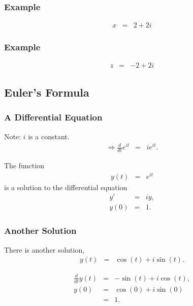 \begin{frame}
  \frametitle{Example}

  \begin{eqnarray*}
    x & = &  2 + 2i
  \end{eqnarray*}

\end{frame}


\begin{frame}
  \frametitle{Example}

  \begin{eqnarray*}
    z & = & -2 + 2i
  \end{eqnarray*}
    
\end{frame}

\subsection{Euler's Formula}

\begin{frame}
  \frametitle{A Differential Equation}

  Note: $i$ is a constant.
  \begin{eqnarray*}
    \Rightarrow \frac{d}{dt} e^{it} & = & i e^{it}.
  \end{eqnarray*}

  The function
  \begin{eqnarray*}
    y(t) & = & e^{it}
  \end{eqnarray*}
  is a solution to the differential equation
  \begin{eqnarray*}
    y' & = & iy, \\
    y(0) & = & 1.
  \end{eqnarray*}

\end{frame}

\begin{frame}
  \frametitle{Another Solution}

  There is another solution,
  \begin{eqnarray*}
    y(t) & = & \cos(t) + i \sin(t).
  \end{eqnarray*}

  \begin{eqnarray*}
    \frac{d}{dt} y(t) & = & -\sin(t) + i \cos(t), \\
    y(0) & = & \cos(0) + i\sin(0) \\
    & = & 1.
  \end{eqnarray*}

\end{frame}


